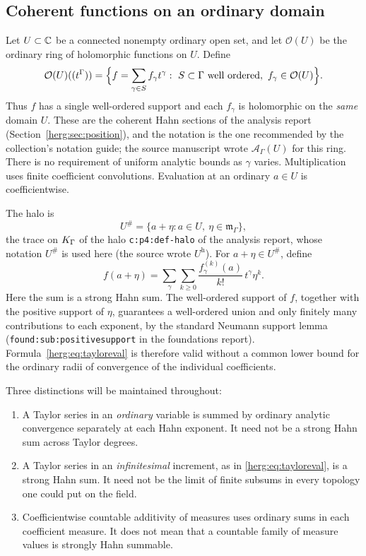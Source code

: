 \documentclass[11pt,letterpaper]{article}
\theoremstyle{definition}
\newcommand{\OU}[1]{\mathcal O(#1)((t^\Gamma))}
\newcommand{\halo}[1]{#1^{\#}}
\newcommand{\lbl}[1]{\nolinkurl{#1}}%
\numberwithin{equation}{section}
\begin{document}
\subsection{Coherent functions on an ordinary domain}

Let $U\subset\mathbb C$ be a connected nonempty ordinary open set, and let $\mathcal O(U)$ be the ordinary ring of holomorphic functions on $U$. Define
\begin{equation}\label{herg:eq:analyticring}
 \OU{U}=\Bigl\{f=\sum_{\gamma\in S}f_\gamma t^\gamma:\ S\subset\Gamma\text{ well ordered},\ f_\gamma\in\mathcal O(U)\Bigr\}.
\end{equation}
Thus $f$ has a single well-ordered support and each $f_\gamma$ is holomorphic on the \emph{same} domain $U$. These are the coherent Hahn sections of the analysis report (Section~\ref{herg:sec:position}), and the notation is the one recommended by the collection's notation guide; the source manuscript wrote $\mathscr A_\Gamma(U)$ for this ring. There is no requirement of uniform analytic bounds as $\gamma$ varies. Multiplication uses finite coefficient convolutions. Evaluation at an ordinary $a\in U$ is coefficientwise.

The halo is
\begin{equation}\label{herg:eq:halo}
 \halo U=\{a+\eta:a\in U,\ \eta\in\mathfrak m_\Gamma\},
\end{equation}
the trace on $K_\Gamma$ of the halo \lbl{c:p4:def-halo} of the analysis report, whose notation $\halo U$ is used here (the source wrote $U^{\mathrm h}$).
For $a+\eta\in\halo U$, define
\begin{equation}\label{herg:eq:tayloreval}
 f(a+\eta)=\sum_{\gamma}\sum_{k\ge0}
 \frac{f_\gamma^{(k)}(a)}{k!}\,t^\gamma\eta^k.
\end{equation}
Here the sum is a strong Hahn sum. The well-ordered support of $f$, together with the positive support of $\eta$, guarantees a well-ordered union and only finitely many contributions to each exponent, by the standard Neumann support lemma (\lbl{found:sub:positivesupport} in the foundations report). Formula~\eqref{herg:eq:tayloreval} is therefore valid without a common lower bound for the ordinary radii of convergence of the individual coefficients.

Three distinctions will be maintained throughout:
\begin{enumerate}[label=(\roman*)]
\item A Taylor series in an \emph{ordinary} variable is summed by ordinary analytic convergence separately at each Hahn exponent. It need not be a strong Hahn sum across Taylor degrees.
\item A Taylor series in an \emph{infinitesimal} increment, as in \eqref{herg:eq:tayloreval}, is a strong Hahn sum. It need not be the limit of finite subsums in every topology one could put on the field.
\item Coefficientwise countable additivity of measures uses ordinary sums in each coefficient measure. It does not mean that a countable family of measure values is strongly Hahn summable.
\end{enumerate}
\end{document}
